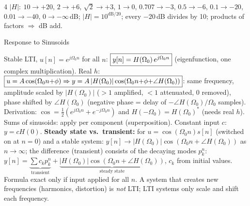 \documentclass[a4paper,landscape]{article}
\newcommand{\sub}[1]{\par\vspace{0.6pt}\noindent\colorbox{subblue}{\parbox{\dimexpr\linewidth-2\fboxsep}{\bfseries\strut #1}}\par\vspace{0.2pt}}
\newcommand{\bx}[1]{\fbox{$\textstyle #1$}}
\begin{document}
\begin{multicols*}{4}
$|H|\!:\ 10\to+20$, $2\to+6$, $\sqrt2\to+3$, $1\to0$, $0.707\to-3$, $0.5\to-6$, $0.1\to-20$, $0.01\to-40$, $0\to-\infty$\,dB; $|H|=10^{\text{dB}/20}$; every $-20$\,dB divides by 10; products of factors $\Rightarrow$ dB add.
\sub{Response to Sinusoids}
Stable LTI, $u[n]=e^{j\Omega_0n}$ for all $n$: $\bx{y[n]=H(\Omega_0)\,e^{j\Omega_0n}}$ (eigenfunction, one complex multiplication).
Real $h$: \ $\bx{u=A\cos(\Omega_0n{+}\phi)\Rightarrow y=A\,|H(\Omega_0)|\cos(\Omega_0n{+}\phi{+}\angle H(\Omega_0))}$:
same frequency, amplitude scaled by $|H(\Omega_0)|$ (${>}1$ amplified, ${<}1$ attenuated, $0$ removed), phase shifted by $\angle H(\Omega_0)$ (negative phase = delay of $-\angle H(\Omega_0)/\Omega_0$ samples). Derivation: $\cos=\frac12(e^{j\Omega_0n}{+}e^{-j\Omega_0n})$ and $H(-\Omega_0)=H(\Omega_0)^*$ (needs real $h$). Sums of sinusoids: apply per component (superposition). Constant input $c$: $y=cH(0)$.
\textbf{Steady state vs.\ transient:} for $u=\cos(\Omega_0n)s[n]$ (switched on at $n{=}0$) and a stable system: $y[n]\to|H(\Omega_0)|\cos(\Omega_0n{+}\angle H(\Omega_0))$ as $n\to\infty$; the difference (transient) consists of the decaying modes $p_k^n$: $y[n]=\underbrace{\textstyle\sum c_kp_k^n}_{\text{transient}}+\underbrace{|H(\Omega_0)|\cos(\Omega_0n{+}\angle H(\Omega_0))}_{\text{steady state}}$, $c_k$ from initial values. Formula exact only if input applied for all $n$.
A system that creates new frequencies (harmonics, distortion) is \emph{not} LTI; LTI systems only scale and shift each frequency.


\end{multicols*}
\end{document}
